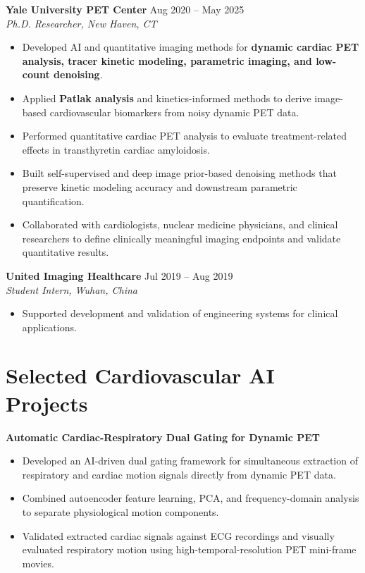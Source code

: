 \textbf{Yale University PET Center} \hfill Aug 2020 -- May 2025 \\
\textit{Ph.D. Researcher, New Haven, CT}
\begin{itemize}[leftmargin=*]
\item Developed AI and quantitative imaging methods for \textbf{dynamic cardiac PET analysis, tracer kinetic modeling, parametric imaging, and low-count denoising}.
\item Applied \textbf{Patlak analysis} and kinetics-informed methods to derive image-based cardiovascular biomarkers from noisy dynamic PET data.
\item Performed quantitative cardiac PET analysis to evaluate treatment-related effects in transthyretin cardiac amyloidosis.
\item Built self-supervised and deep image prior-based denoising methods that preserve kinetic modeling accuracy and downstream parametric quantification.
\item Collaborated with cardiologists, nuclear medicine physicians, and clinical researchers to define clinically meaningful imaging endpoints and validate quantitative results.
\end{itemize}

\textbf{United Imaging Healthcare} \hfill Jul 2019 -- Aug 2019 \\
\textit{Student Intern, Wuhan, China}
\begin{itemize}[leftmargin=*]
\item Supported development and validation of engineering systems for clinical applications.
\end{itemize}

\section{Selected Cardiovascular AI Projects}

\textbf{Automatic Cardiac-Respiratory Dual Gating for Dynamic PET}
\begin{itemize}[leftmargin=*]
\item Developed an AI-driven dual gating framework for simultaneous extraction of respiratory and cardiac motion signals directly from dynamic PET data.
\item Combined autoencoder feature learning, PCA, and frequency-domain analysis to separate physiological motion components.
\item Validated extracted cardiac signals against ECG recordings and visually evaluated respiratory motion using high-temporal-resolution PET mini-frame movies.
\end{itemize}

